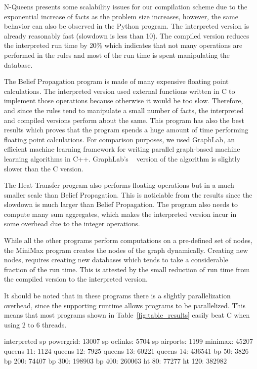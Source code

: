 N-Queens presents some scalability issues for our compilation scheme due to the
exponential increase of facts as the problem size increases,
however, the same behavior can also be observed in the Python program. The
interpreted version is already reasonably fast (slowdown is less than 10). The
compiled version reduces the interpreted run time by 20\% which indicates that
not many operations are performed in the rules and most of the run time is spent
manipulating the database.

The Belief Propagation program is made of many expensive floating point
calculations. The interpreted version used external functions written in C to
implement those operations because otherwise it would be too slow. Therefore,
and since the rules tend to manipulate a small number of facts, the interpreted
and compiled versions perform about the same. This program has also the best
results which proves that the program spends a huge amount of time performing
floating point calculations. For comparison purposes, we used GraphLab, an
efficient machine learning framework for writing parallel graph-based machine
learning algorithms in C++.  GraphLab's ~\cite{GraphLab2010} version of the
algorithm is slightly slower than the C version.

The Heat Transfer program also performs floating operations but in a much
smaller scale than Belief Propagation. This is noticiable from the results since
the slowdown is much larger than Belief Propagation. The program also needs to
compute many sum aggregates, which makes the interpreted version incur in some
overhead due to the integer operations.

While all the other programs perform computations on a pre-defined set of nodes,
the MiniMax program creates the nodes of the graph dynamically.
Creating new nodes, requires creating new databases which tends to take a
considerable fraction of the run time. This is attested by the small reduction
of run time from the compiled version to the interpreted version.

It should be noted that in these programs there is a slightly parallelization
overhead, since the supporting runtime allows programs to be parallelized.
This means that most programs shown in Table~\ref{fig:table_results} easily beat C
when using 2 to 6 threads.


\iffalse
interpreted
sp powergrid: 13007
sp oclinks: 5704
sp airports: 1199
minimax: 45207
queens 11: 1124
queens 12: 7925
queens 13: 60221
queens 14: 436541
bp 50: 3826
bp 200: 74407
bp 300: 198903
bp 400: 260063
ht 80: 77277
ht 120: 382982

